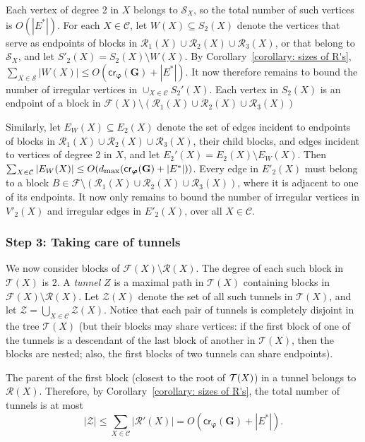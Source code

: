 \documentclass[twoside,leqno,twocolumn]{article}
\newcommand{\sse}{\subseteq}
\newcommand{\tset}{{\mathcal T}}
\newcommand{\cset}{{\mathcal{C}}}
\newcommand{\fset}{{\mathcal{F}}}
\newcommand{\rset}{{\mathcal{R}}}
\newcommand{\zset}{{\mathcal{Z}}}
\newcommand{\sset}{{\mathcal{S}}}
\newcommand{\cro}{\mathsf{cr}}
\newcommand{\dmax}{d_{\mbox{\textup{\footnotesize{max}}}}}
\newcommand{\G}{{\mathbf{G}}}
\newcommand{\bphi}{{\boldsymbol{\varphi}}}
\begin{document}
Each vertex of degree 2 in $X$ belongs to $\sset_X$, so the
total number of such vertices is $O(|E^*|)$.
For each $X\in \cset$, let $W(X)\sse S_2(X)$ denote the vertices that serve as endpoints of blocks in $\rset_1(X)\cup \rset_2(X)\cup \rset_3(X)$, or that belong to $\sset_X$, and let $S'_2(X)=S_2(X)\setminus W(X)$.
By Corollary~\ref{corollary: sizes of R's}, $\sum_{X\in\sset}|W(X)|\leq O(\cro_{\bphi}(\G) + |E^*|)$. It now therefore remains to bound the number of irregular vertices in $\cup_{X\in\cset}S_2'(X)$. Each vertex in $S_2(X)$ is an endpoint of a block in $\fset(X)\setminus (\rset_1(X)\cup \rset_2(X)\cup \rset_3(X))$
 
Similarly, let $E_W(X)\sse E_2(X)$ denote the set of edges incident to endpoints of blocks
in $\rset_1(X) \cup \rset_2(X) \cup \rset_3(X)$, their child blocks, and
edges incident to vertices of degree 2 in $X$, and let $E_2'(X)=E_2(X)\setminus E_W(X)$. Then $\sum_{X\in \cset}|E_W(X)|\leq O(\dmax(\cro_{\bphi}(\G) + |E^*|))$.
Every edge in $E'_2(X)$ 
must belong to a block $B\in \fset\setminus(\rset_1(X) \cup \rset_2(X) \cup \rset_3(X))$, where it is adjacent to one of its endpoints.
It now only remains to bound the number of irregular vertices in $V'_2(X)$ and irregular edges in $E'_2(X)$, over all $X\in \cset$.
\fi

\subsubsection*{Step 3: Taking care of tunnels} 
We now consider blocks of $\fset(X)\setminus\rset(X)$.
The degree of each such block in $\tset(X)$ is $2$.
A \emph{tunnel} $Z$ is a maximal path in $\tset(X)$ containing blocks in 
$\fset(X)\setminus \rset(X)$.
Let $\zset(X)$ denote the set of all such tunnels in $\tset(X)$, and let $\zset=\bigcup_{X\in\cset}\zset(X)$. Notice that each pair of tunnels is completely 
disjoint in the tree $\tset(X)$ (but their blocks may share vertices: if the first block of one of the tunnels is a descendant of the last block of another in $\tset(X)$, then the blocks are nested; also, the first blocks of two tunnels can share endpoints). 


The parent of the first block (closest to the root of ${\cal T}(X)$) in a tunnel 
belongs to $\rset(X)$. 
Therefore, by Corollary~\ref{corollary: sizes of R's}, the total number of tunnels is at most
\begin{equation}
|\zset|\leq\sum_{X\in \cset} |\rset'(X)| = O(\cro_{\bphi}(\G) + |E^*|). \label{eq:num of tunnels}
\end{equation}
\end{document}
